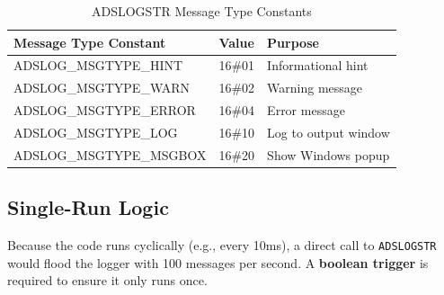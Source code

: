 \documentclass[11pt,a4paper]{article}
\begin{document}
\begin{table}[h]
\centering
\begin{tabular}{@{}lll@{}}
\toprule
\textbf{Message Type Constant} & \textbf{Value} & \textbf{Purpose} \\
\midrule
ADSLOG\_MSGTYPE\_HINT & 16\#01 & Informational hint \\
ADSLOG\_MSGTYPE\_WARN & 16\#02 & Warning message \\
ADSLOG\_MSGTYPE\_ERROR & 16\#04 & Error message \\
ADSLOG\_MSGTYPE\_LOG & 16\#10 & Log to output window \\
ADSLOG\_MSGTYPE\_MSGBOX & 16\#20 & Show Windows popup \\
\bottomrule
\end{tabular}
\caption{ADSLOGSTR Message Type Constants}
\end{table}

\subsection{Single-Run Logic}

Because the code runs cyclically (e.g., every 10ms), a direct call to \texttt{ADSLOGSTR} would flood the logger with 100 messages per second. A \textbf{boolean trigger} is required to ensure it only runs once.
\end{document}
